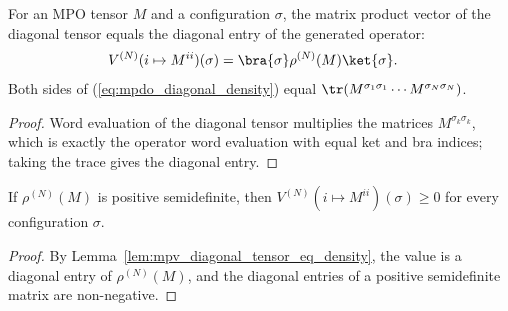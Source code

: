 \begin{lemma}
    \label{lem:mpv_diagonal_tensor_eq_density}
    \leanok
    For an MPO tensor $M$ and a configuration $\sigma$, the matrix product vector of
    the diagonal tensor equals the diagonal entry of the generated operator:
    \begin{align}
        V^{(N)}(i\mapsto M^{ii})(\sigma)
        &=\bra{\sigma}\rho^{(N)}(M)\ket{\sigma}.
        \label{eq:mpdo_diagonal_density}
    \end{align}
    Both sides of (\ref{eq:mpdo_diagonal_density}) equal
    $\tr(M^{\sigma_1\sigma_1}\cdots M^{\sigma_N\sigma_N})$.
\end{lemma}
\begin{proof}\leanok
    Word evaluation of the diagonal tensor multiplies the matrices
    $M^{\sigma_k\sigma_k}$, which is exactly the operator word evaluation with equal
    ket and bra indices; taking the trace gives the diagonal entry.
\end{proof}

\begin{lemma}
    \label{lem:mpv_diagonal_tensor_nonneg}
    \leanok
    If $\rho^{(N)}(M)$ is positive semidefinite, then
    $V^{(N)}(i\mapsto M^{ii})(\sigma)\geq0$ for every configuration
    $\sigma$.
\end{lemma}
\begin{proof}\leanok
    By Lemma~\ref{lem:mpv_diagonal_tensor_eq_density}, the value is a diagonal
    entry of $\rho^{(N)}(M)$, and the diagonal entries of a positive semidefinite
    matrix are non-negative.
\end{proof}

